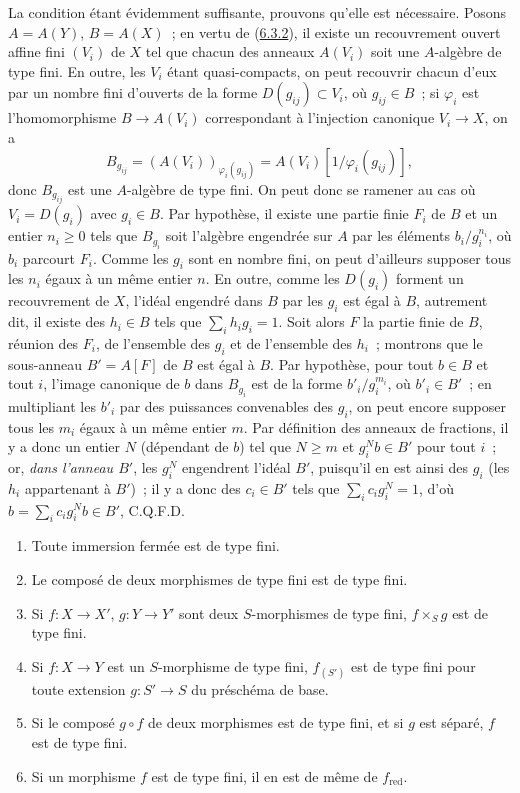La condition étant évidemment suffisante, prouvons qu'elle est nécessaire.
Posons $A=A(Y)$, $B=A(X)$~; en vertu de
(\hyperref[I.6.3.2-fr]{6.3.2}), il existe un recouvrement ouvert affine fini
$(V_i)$ de $X$ tel que chacun des anneaux $A(V_i)$ soit une $A$-algèbre de
type fini. En outre, les $V_i$ étant quasi-compacts, on peut recouvrir chacun
d'eux par un nombre fini d'ouverts de la forme $D(g_{ij})\subset V_i$, où
$g_{ij}\in B$~; si $\varphi_i$ est l'homomorphisme $B\to A(V_i)$ correspondant
à l'injection canonique $V_i\to X$, on a
\[
  B_{g_{ij}}=(A(V_i))_{\varphi_i(g_{ij})}
  =A(V_i)[1/\varphi_i(g_{ij})],
\]
donc $B_{g_{ij}}$ est une $A$-algèbre de type fini. On peut donc se ramener
au cas où $V_i=D(g_i)$ avec $g_i\in B$. Par hypothèse, il existe une partie
finie $F_i$ de $B$ et un entier $n_i\geq 0$ tels que $B_{g_i}$ soit l'algèbre
engendrée sur $A$ par les éléments $b_i/g_i^{n_i}$, où $b_i$ parcourt $F_i$.
Comme les $g_i$ sont en nombre fini, on peut d'ailleurs supposer tous les
$n_i$ égaux à un même entier $n$. En outre, comme les $D(g_i)$ forment un
recouvrement de $X$, l'idéal engendré dans $B$ par les $g_i$ est égal à $B$,
autrement dit, il existe des $h_i\in B$ tels que
$\sum_i h_i g_i=1$. Soit alors $F$ la partie finie de $B$, réunion des $F_i$,
de l'ensemble des $g_i$ et de l'ensemble des $h_i$~; montrons que le
sous-anneau $B'=A[F]$ de $B$ est égal à $B$. Par hypothèse, pour tout $b\in B$
et tout $i$, l'image canonique de $b$ dans $B_{g_i}$ est de la forme
$b'_i/g_i^{m_i}$, où $b'_i\in B'$~; en multipliant les $b'_i$ par des
puissances convenables des $g_i$, on peut encore supposer tous les $m_i$
égaux à un même entier $m$. Par définition des anneaux de fractions, il y a
donc un entier $N$ (dépendant de $b$) tel que $N\geq m$ et $g_i^N b\in B'$ pour
tout $i$~; or, \emph{dans l'anneau $B'$}, les $g_i^N$ engendrent l'idéal $B'$,
puisqu'il en est ainsi des $g_i$ (les $h_i$ appartenant à $B'$)~; il y a donc
des $c_i\in B'$ tels que $\sum_i c_i g_i^N=1$, d'où
$b=\sum_i c_i g_i^N b\in B'$, C.Q.F.D.

\begin{proposition}[6.3.4]
\label{I.6.3.4-fr}
\begin{enumerate}
  \item[(i)] Toute immersion fermée est de type fini.
  \item[(ii)] Le composé de deux morphismes de type fini est de type fini.
  \item[(iii)] Si $f:X\to X'$, $g:Y\to Y'$ sont deux $S$-morphismes de type
    fini, $f\times_S g$ est de type fini.
  \item[(iv)] Si $f:X\to Y$ est un $S$-morphisme de type fini, $f_{(S')}$ est
    de type fini pour toute extension $g:S'\to S$ du préschéma de base.
  \item[(v)] Si le composé $g\circ f$ de deux morphismes est de type fini, et
    si $g$ est séparé, $f$ est de type fini.
  \item[(vi)] Si un morphisme $f$ est de type fini, il en est de même de
    $f_{\mathrm{red}}$.
\end{enumerate}
\end{proposition}

